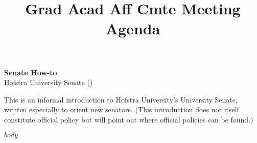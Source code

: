 \documentclass[12pt]{article}
\title{Grad Acad Aff Cmte Meeting Agenda \DTMusedate{meetingdate}}
\begin{document}
\thispagestyle{empty}



\begin{center}
  \textbf{\large Senate How-to} \\ Hofstra University Senate (\the\year) 
\end{center}



\noident This is an informal introduction to Hofstra University's University
Senate, written especially to orient new senators. (This introduction
does not itself constitute official policy but will point out where
official policies can be found.)



\begin{center}
\begin{minipage}[c]{4.25in} %
\tableofcontents
\end{minipage}
\end{center}



$body$
\end{document}
